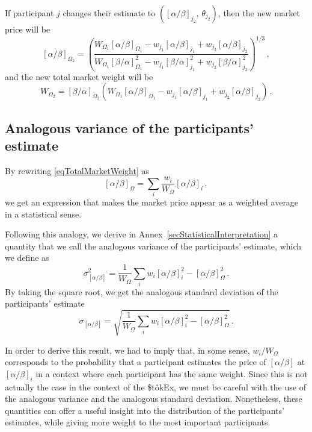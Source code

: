 \documentclass[letterpaper]{article}
\newcommand{\priceAB}{\left[\alpha / \beta\right]}
\newcommand{\priceBA}{\left[\beta / \alpha\right]}
\newcommand{\StokEx}{\$t\^{o}kEx}
\begin{document}
If participant $j$ changes their estimate to $(\priceAB_{j_2},\, \theta_{j_2})$, then the new market price will be
\begin{equation}
    \priceAB_{\Omega_2} = \left( \frac{W_{\Omega_1}\priceAB_{\Omega_1} - w_{j_1} \priceAB_{j_1} + w_{j_2} \priceAB_{j_2}}{W_{\Omega_1} \priceBA_{\Omega_1}^2 - w_{j_1}\priceBA_{j_1}^2 + w_{j_2}\priceBA_{j_2}^2}\right)^{1/3} \, ,
\end{equation}
and the new total market weight will be
\begin{equation}
    W_{\Omega_2} = \priceBA_{\Omega_2} \left( W_{\Omega_1}\priceAB_{\Omega_1} - w_{j_1} \priceAB_{j_1} + w_{j_2} \priceAB_{j_2} \right) \, .
\end{equation}

\subsection{Analogous variance of the participants' estimate}

By rewriting \eqref{eqTotalMarketWeight} as
\begin{equation}
    \priceAB_\Omega = \sum_i \frac{w_i}{W_\Omega} \priceAB_i\,,
\end{equation}
we get an expression that makes the market price appear as a weighted average in a statistical sense.

Following this analogy, we derive in Annex~\ref{secStatisticalInterpretation} a quantity that we call the analogous variance of the participants' estimate, which we define as
\begin{equation}
    \sigma_{\priceAB}^2 = \frac{1}{W_\Omega} \sum_i w_i \priceAB_i^2 - \priceAB_\Omega^2\,.
\end{equation}
By taking the square root, we get the analogous standard deviation of the participants' estimate
\begin{equation}
    \sigma_{\priceAB} = \sqrt{\frac{1}{W_\Omega} \sum_i w_i \priceAB_i^2 - \priceAB_\Omega^2}\,.
\end{equation}

In order to derive this result, we had to imply that, in some sense, $w_i/W_\Omega$ corresponds to the probability that a participant estimates the price of $\priceAB$ at $\priceAB_i$ in a context where each participant has the same weight. Since this is not actually the case in the context of the \StokEx{}, we must be careful with the use of the analogous variance and the analogous standard deviation. Nonetheless, these quantities can offer a useful insight into the distribution of the participants' estimates, while giving more weight to the most important participants.
\end{document}

